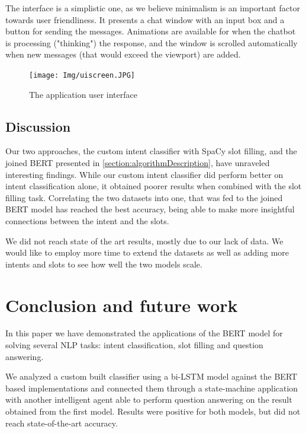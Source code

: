 \documentclass[runningheads,a4paper,11pt]{report}
\begin{document}
The interface is a simplistic one, as we believe minimalism is an important factor towards user friendliness. It presents a chat window with an input box and a button for sending the messages. Animations are available for when the chatbot is processing ("thinking") the response, and the window is scrolled automatically when new messages (that would exceed the viewport) are added.

\begin{figure}[ht!]
\centerline{\texttt{[image: Img/uiscreen.JPG]}}  
	\caption{The application user interface}
	\label{uiscreen}
\end{figure}


\section{Discussion}
\label{section:discussion}

Our two approaches, the custom intent classifier with SpaCy slot filling, and the joined BERT presented in \ref{section:algorithmDescription}, have unraveled interesting findings. While our custom intent classifier did perform better on intent classification alone, it obtained poorer results when combined with the slot filling task. Correlating the two datasets into one, that was fed to the joined BERT model has reached the best accuracy, being able to make more insightful connections between the intent and the slots. 

We did not reach state of the art results, mostly due to our lack of data. We would like to employ more time to extend the datasets as well as adding more intents and slots to see how well the two models scale.


\chapter{Conclusion and future work}
\label{chapter:concl}

In this paper we have demonstrated the applications of the BERT model for solving several NLP tasks: intent classification, slot filling and question answering. 

We analyzed a custom built classifier using a bi-LSTM model against the BERT based implementations and connected them through a state-machine application with another intelligent agent able to perform question answering on the result obtained from the first model. Results were positive for both models, but did not reach state-of-the-art accuracy. 
\end{document}
